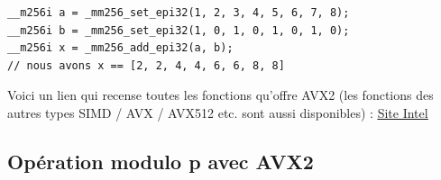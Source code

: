 \documentclass[12pt, a4paper]{article}
\begin{document}
\begin{lstlisting}
__m256i a = _mm256_set_epi32(1, 2, 3, 4, 5, 6, 7, 8);
__m256i b = _mm256_set_epi32(1, 0, 1, 0, 1, 0, 1, 0);
__m256i x = _mm256_add_epi32(a, b);
// nous avons x == [2, 2, 4, 4, 6, 6, 8, 8]
\end{lstlisting}

\indent Voici un lien qui recense toutes les fonctions qu'offre AVX2 (les fonctions des  autres types SIMD / AVX / AVX512 etc. sont aussi disponibles) : \href{https://www.intel.com/content/www/us/en/docs/intrinsics-guide/index.html#techs=AVX,AVX2}{\underline{\color{blue}Site Intel}}

\subsection{Opération modulo p avec AVX2}
\end{document}
